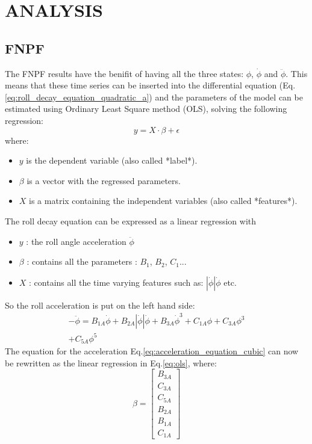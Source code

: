 \section*{ANALYSIS}\label{analysis}
\subsection*{FNPF}\label{fnpf}
The FNPF results have the benifit of having all the three states:
$\phi$, $\dot{\phi}$ and $\ddot{\phi}$. This means that these time
series can be inserted into the differential equation
(Eq.\ref{eq:roll_decay_equation_quadratic_a}) and the parameters
of the model can be estimated using Ordinary Least Square method (OLS),
solving the following regression:
\begin{equation}
y = X \cdot \beta + \epsilon
\label{eq:ols}
\end{equation}
where:
\begin{itemize}
\item $y$ is the dependent variable (also called *label*).
\item $\beta$ is a vector with the regressed parameters.
\item $X$ is a matrix containing the independent variables (also called *features*).
\end{itemize}
The roll decay equation can be expressed as a linear regression with
\begin{itemize}
\item $y$ : the roll angle acceleration $\ddot{\phi}$
\item $\beta$ : contains all the parameters : $B_1$, $B_2$, $C_1$...
\item $X$ : contains all the time varying features such as: $| \dot{\phi} | \dot{\phi} $ etc.
\end{itemize}
So the roll acceleration is put on the left hand side:
\begin{equation}
\begin{aligned}
- \ddot{\phi} = B_{1A} \dot{\phi} + B_{2A} \left|{\dot{\phi}}\right| \dot{\phi} + B_{3A} \dot{\phi}^{3} + C_{1A} \phi + C_{3A} \phi^{3} \\ + C_{5A} \phi^{5}
\end{aligned}
\label{eq:acceleration_equation_cubic}
\end{equation}
The equation for the acceleration
Eq.\ref{eq:acceleration_equation_cubic} can now be rewritten as
the linear regression in Eq.\ref{eq:ols}, where:
\begin{equation}
\beta = \left[\begin{matrix}B_{3A}\\C_{3A}\\C_{5A}\\B_{2A}\\B_{1A}\\C_{1A}\end{matrix}\right]
\label{eq:eq_beta}
\end{equation}
